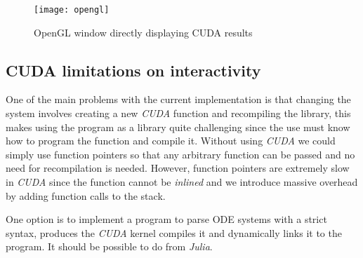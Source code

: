 \begin{figure}[H]
    \centering
    \texttt{[image: opengl]}
    \caption{OpenGL window directly displaying CUDA results}%
    \label{fig:opengl}
\end{figure}

\subsection{CUDA limitations on interactivity}

One of the main problems with the current implementation is that changing the system
involves creating a new \emph{CUDA} function and recompiling the library, this makes using the program as a library quite challenging since the use must know how to program the function and compile it. Without using \emph{CUDA} we could simply use function pointers so that any arbitrary  function can be passed and no need for recompilation is needed. However, function pointers are extremely slow in \emph{CUDA} since the function cannot be \emph{inlined} and we introduce massive overhead by
adding function calls to the stack.

One option is to implement a program to parse ODE systems with a strict syntax, produces the \emph{CUDA} kernel compiles it and dynamically links it to the program. It should be possible to do from \emph{Julia}.